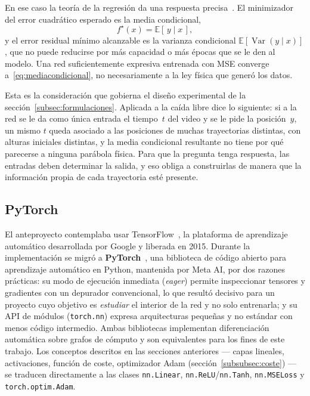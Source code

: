\documentclass[titlepage,11pt]{article}
\begin{document}
En ese caso la teoría de la regresión da una respuesta
precisa~\cite{hastie_2009_elements}. El minimizador
del error cuadrático esperado es la media condicional,
\begin{equation}
  f^{\star}(x)=\mathbb{E}[\,y\mid x\,],
  \label{eq:mediacondicional}
\end{equation}
y el error residual mínimo alcanzable es la varianza condicional
$\mathbb{E}[\operatorname{Var}(y\mid x)]$, que no puede reducirse por más
capacidad o más épocas que se le den al modelo. Una red suficientemente
expresiva entrenada con MSE converge a~\eqref{eq:mediacondicional}, no
necesariamente a la ley física que generó los datos.

Esta es la consideración que gobierna el diseño experimental de la
sección~\ref{subsec:formulaciones}. Aplicada a la caída libre dice lo
siguiente: si a la red se le da como única entrada el tiempo~$t$ del video y se
le pide la posición~$y$, un mismo $t$ queda asociado a las posiciones de
muchas trayectorias distintas, con alturas iniciales distintas, y la media
condicional resultante no tiene por qué parecerse a ninguna parábola física.
Para que la pregunta tenga respuesta, las entradas deben determinar la salida,
y eso obliga a construirlas de manera que la información propia de cada
trayectoria esté presente.

\subsection{PyTorch}
\label{subsec:ts}
El anteproyecto contemplaba usar TensorFlow~\cite{TensorFlow}, la plataforma de
aprendizaje automático desarrollada por Google y liberada en 2015. Durante la
implementación se migró a \textbf{PyTorch}~\cite{paszke_2019_pytorch}, una biblioteca de
código abierto para aprendizaje automático en Python,
mantenida por Meta AI, por dos razones prácticas: su modo de ejecución
inmediata (\emph{eager}) permite inspeccionar tensores y gradientes con un
depurador convencional, lo que resultó decisivo para un proyecto cuyo objetivo
es \emph{estudiar} el interior de la red y no solo entrenarla; y su API de
módulos (\texttt{torch.nn}) expresa arquitecturas pequeñas y no estándar con
menos código intermedio. Ambas bibliotecas implementan diferenciación
automática sobre grafos de cómputo y son equivalentes para los fines de este
trabajo. Los conceptos descritos en las secciones anteriores --- capas
lineales, activaciones, función de coste, optimizador Adam
(sección~\ref{subsubsec:coste}) --- se traducen
directamente a las clases \texttt{nn.Linear}, \texttt{nn.ReLU}/\texttt{nn.Tanh},
\texttt{nn.MSELoss} y \texttt{torch.optim.Adam}.
\end{document}
